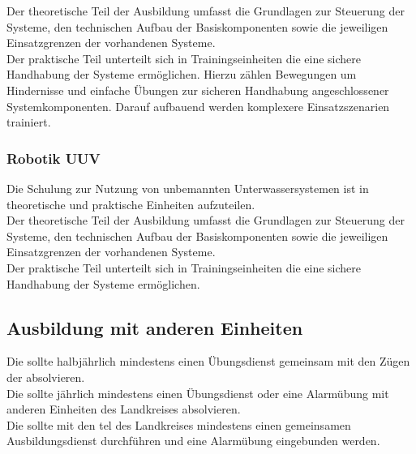 \noindent Der theoretische Teil der Ausbildung umfasst die Grundlagen zur Steuerung der Systeme, den technischen Aufbau der Basiskomponenten sowie die jeweiligen Einsatzgrenzen der vorhandenen Systeme.\\

\noindent Der praktische Teil unterteilt sich in Trainingseinheiten die eine sichere Handhabung der Systeme ermöglichen. Hierzu zählen Bewegungen um Hindernisse und einfache Übungen zur sicheren Handhabung angeschlossener Systemkomponenten. Darauf aufbauend werden komplexere Einsatzszenarien trainiert.

\subsubsection{Robotik UUV}

Die Schulung zur Nutzung von unbemannten Unterwassersystemen ist in theoretische und praktische Einheiten aufzuteilen.\\

\noindent Der theoretische Teil der Ausbildung umfasst die Grundlagen zur Steuerung der Systeme, den technischen Aufbau der Basiskomponenten sowie die jeweiligen Einsatzgrenzen der vorhandenen Systeme.\\

\noindent Der praktische Teil unterteilt sich in Trainingseinheiten die eine sichere Handhabung der Systeme ermöglichen.

\subsection{Ausbildung mit anderen Einheiten}

Die \callee{} sollte halbjährlich mindestens einen Übungsdienst gemeinsam mit den Zügen der \unit{} absolvieren.\\

\noindent Die \callee{} sollte jährlich mindestens einen Übungsdienst
oder eine Alarmübung mit anderen Einheiten des Landkreises \district{} absolvieren.\\

\noindent Die \callee{} sollte mit den \ac{tel} des Landkreises \district{} mindestens einen gemeinsamen Ausbildungsdienst durchführen und eine Alarmübung eingebunden werden.
